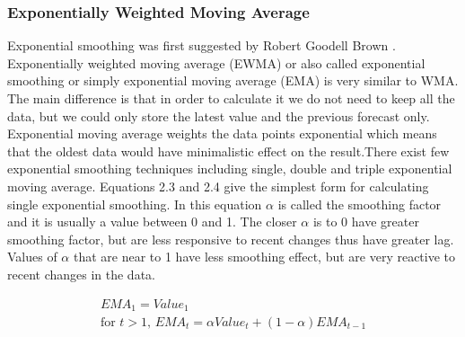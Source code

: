 \begin{figure}[ht]
	\caption{}
	\label{fig:wmaGraph}
\end{figure}

\FloatBarrier
\subsubsection{Exponentially Weighted Moving Average}
Exponential smoothing was first suggested by Robert Goodell Brown \cite{FOR3980040103}. Exponentially weighted moving average (EWMA) or also called exponential smoothing or simply exponential moving average (EMA) is very similar to WMA. The main difference is that in order to calculate it we do not need to keep all the data, but we could only store the latest value and the previous forecast only. Exponential moving average weights the data points exponential which means that the oldest data would have minimalistic effect on the result.There exist few exponential smoothing techniques including single, double and triple exponential moving average. Equations 2.3 and 2.4 give the simplest form for calculating single exponential smoothing. In this equation $\alpha$ is called the smoothing factor and it is usually a value between 0 and 1. The closer $\alpha$ is to 0 have greater smoothing factor, but are less responsive to recent changes thus have greater lag. Values of $\alpha$ that are near to 1 have less smoothing effect, but are very reactive to recent changes in the data. 

\begin{align}\label{ema}
EMA_1 = Value_1 \\
\textrm{for } t > 1\textrm{, }EMA_t = \alpha Value_t + (1-\alpha) EMA_{t-1}
\end{align}


